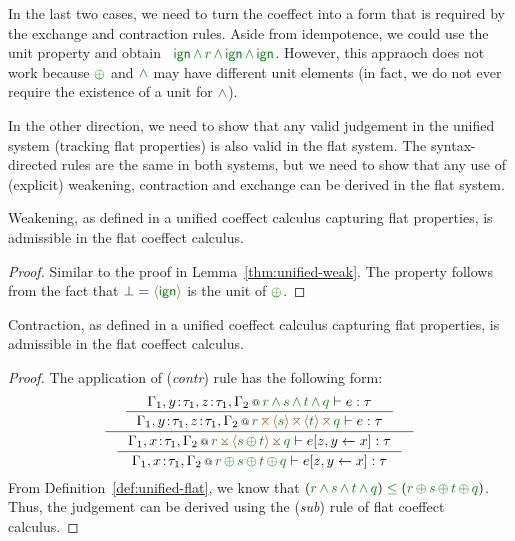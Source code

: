 \noindent
In the last two cases, we need to turn the coeffect into a form that is required by the exchange
and contraction rules. Aside from idempotence, we could use the unit property and obtain 
\eg~$\czero\,\czip\,\cclrd{r}\,\czip\,\czero\,\czip\,\czero$. However, this appraoch does not 
work because $\cpar$ and $\czip$ may have different unit elements (in fact, we do not ever require
the existence of a unit for $\czip$).

In the other direction, we need to show that any valid judgement in the unified system (tracking
flat properties) is also valid in the flat system. The syntax-directed rules are the same in both
systems, but we need to show that any use of (explicit) weakening, contraction and exchange can be
derived in the flat system. 

\begin{lemma}
Weakening, as defined in a unified coeffect calculus capturing flat properties, is admissible in 
the flat coeffect calculus.
\end{lemma}
\begin{proof}
Similar to the proof in Lemma~\ref{thm:unified-weak}. The property follows from the fact that 
$\bot=\alift{\czero}$ is the unit of $\cpar$.
\end{proof}

\begin{lemma}
\label{thm:unified-rev-contr}
Contraction, as defined in a unified coeffect calculus capturing flat properties, is admissible in 
the flat coeffect calculus.
\end{lemma}
\begin{proof}
The application of (\emph{contr}) rule has the following form:
\begin{equation*}
\inference
 { \inference
    {\coctx{\Gamma_1,y\!:\!\tau_1,z\!:\!\tau_1,\Gamma_2}{\cclrd{r} \,\czip\, \cclrd{s} \,\czip\, \cclrd{t} \,\czip\, \cclrd{q}} \vdash e : \tau}
    {\coctx{\Gamma_1,y\!:\!\tau_1,z\!:\!\tau_1,\Gamma_2}{\cclrd{r} \,\azip\, \alift{\cclrd{s}} \,\azip\, \alift{\cclrd{t}} \,\azip\, \cclrd{q}} \vdash e : \tau} }
 { \inference
    {\coctx{\Gamma_1,x\!:\!\tau_1,\Gamma_2}{\cclrd{r} \,\apar\, \alift{\cclrd{s} \,\cpar\, \cclrd{t}} \,\apar\, \cclrd{q}} \vdash \subst{e}{z,y}{x} : \tau}
    {\coctx{\Gamma_1,x\!:\!\tau_1,\Gamma_2}{\cclrd{r} \,\cpar\, \cclrd{s} \,\cpar\, \cclrd{t} \,\cpar\, \cclrd{q}} \vdash \subst{e}{z,y}{x} : \tau} } 
\end{equation*}
%
From Definition~\ref{def:unified-flat}, we know that $(\cclrd{r} \,\czip\, \cclrd{s} \,\czip\, \cclrd{t} \,\czip\, \cclrd{q}) 
\;\cleq\; (\cclrd{r} \,\cpar\, \cclrd{s} \,\cpar\, \cclrd{t} \,\cpar\, \cclrd{q})$. Thus, the judgement
 can be derived using the (\emph{sub}) rule of flat coeffect calculus.
\end{proof}


